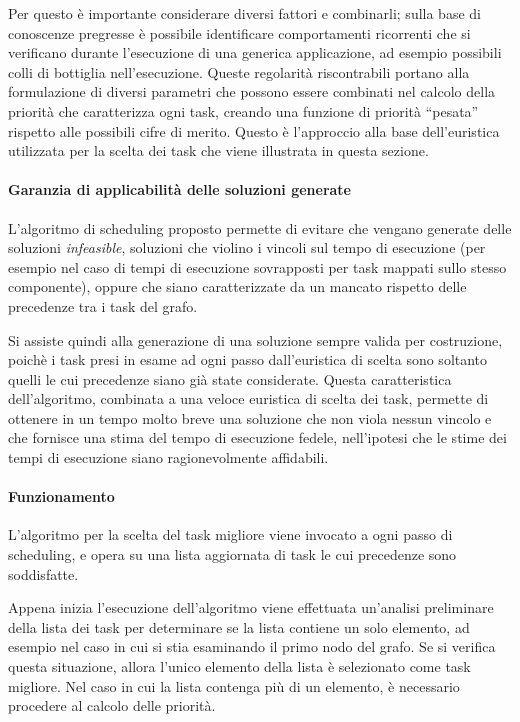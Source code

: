 Per questo è importante considerare diversi fattori e combinarli; sulla 
base di conoscenze pregresse è possibile identificare comportamenti 
ricorrenti che si verificano durante l'esecuzione di una generica applicazione, 
ad esempio possibili colli di bottiglia nell'esecuzione. Queste regolarità 
riscontrabili portano alla formulazione di diversi parametri che possono essere 
combinati nel calcolo della priorità che caratterizza ogni task, creando una 
funzione di priorità ``pesata'' rispetto alle possibili cifre di merito. Questo 
è l'approccio alla base dell'euristica utilizzata per la scelta dei task che 
viene illustrata in questa sezione.

\paragraph{Garanzia di applicabilità delle soluzioni generate}
L'algoritmo di scheduling proposto permette di evitare che vengano generate 
delle soluzioni \emph{infeasible}, soluzioni che violino i vincoli sul tempo di 
esecuzione (per esempio nel caso di tempi di esecuzione sovrapposti per task 
mappati sullo stesso componente), oppure che siano caratterizzate da un mancato 
rispetto delle precedenze tra i task del grafo.

Si assiste quindi alla generazione di una soluzione sempre valida per 
costruzione, poichè i task presi in esame ad ogni passo dall'euristica di 
scelta sono soltanto quelli le cui precedenze siano già state considerate. 
Questa caratteristica dell'algoritmo, combinata a una veloce euristica di scelta 
dei task, permette di ottenere in un tempo molto breve una soluzione che non 
viola nessun vincolo e che fornisce una stima del tempo di esecuzione fedele, 
nell'ipotesi che le stime dei tempi di esecuzione siano ragionevolmente 
affidabili.


\paragraph{Funzionamento}
L'algoritmo per la scelta del task migliore viene invocato a ogni passo di 
scheduling, e opera su una lista aggiornata di task le cui precedenze sono 
soddisfatte.

Appena inizia l'esecuzione dell'algoritmo viene effettuata un'analisi 
preliminare della lista dei task per determinare se la lista contiene un solo 
elemento, ad esempio nel caso in cui si stia esaminando il primo nodo del 
grafo. Se si verifica questa situazione, allora l'unico elemento della lista è 
selezionato come task migliore. Nel caso in cui la lista contenga più di un 
elemento, è necessario procedere al calcolo delle priorità.

